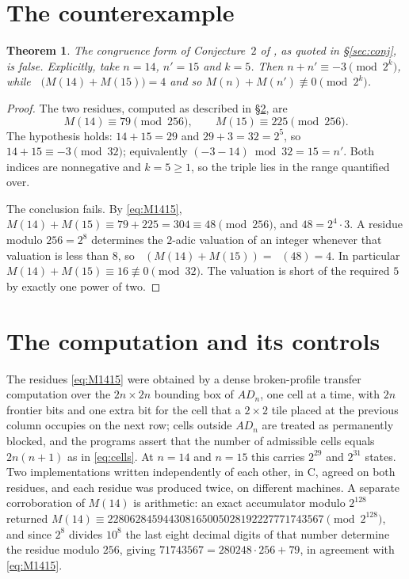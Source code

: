 \documentclass[11pt]{amsart}
\newtheorem{theorem}{Theorem}
\DeclareMathOperator{\vtwo}{v_2}
\begin{document}
\section{The counterexample}\label{sec:refute}

\begin{theorem}\label{thm:main}
The congruence form of Conjecture~$2$ of \cite{Propp}, as quoted in
\S\ref{sec:conj}, is false. Explicitly, take $n=14$, $n'=15$ and
$k=5$. Then $n+n'\equiv-3 \pmod{2^k}$, while
$\vtwo\bigl(M(14)+M(15)\bigr)=4$ and so $M(n)+M(n')\not\equiv0 \pmod{2^{k}}$.
\end{theorem}

\begin{proof}
The two residues, computed as described in \S\ref{sec:verify}, are
\begin{equation}\label{eq:M1415}
  M(14)\equiv 79 \pmod{256},
  \qquad
  M(15)\equiv 225 \pmod{256}.
\end{equation}
The hypothesis holds: $14+15=29$ and $29+3=32=2^5$, so $14+15\equiv-3
\pmod{32}$; equivalently $(-3-14) \bmod 32 = 15 = n'$. Both indices are
nonnegative and $k=5\ge1$, so the triple lies in the range quantified over.

The conclusion fails. By \eqref{eq:M1415}, $M(14)+M(15)\equiv 79+225=304\equiv
48\pmod{256}$, and $48=2^4\cdot3$. A residue modulo $256=2^8$ determines the
$2$-adic valuation of an integer whenever that valuation is less than $8$, so
$\vtwo(M(14)+M(15))=\vtwo(48)=4$. In particular
$M(14)+M(15)\equiv16\not\equiv0\pmod{32}$. The valuation is short of the
required $5$ by exactly one power of two.
\end{proof}

\section{The computation and its controls}\label{sec:verify}

The residues \eqref{eq:M1415} were obtained by a dense broken-profile transfer
computation over the $2n\times2n$ bounding box of $AD_n$, one cell at a time,
with $2n$ frontier bits and one extra bit for the cell that a $2\times2$ tile
placed at the previous column occupies on the next row; cells outside $AD_n$
are treated as permanently blocked, and the programs assert that the number of
admissible cells equals $2n(n+1)$ as in \eqref{eq:cells}. At $n=14$ and $n=15$
this carries $2^{29}$ and $2^{31}$ states. Two implementations written
independently of each other, in C, agreed on both residues, and each residue
was produced twice, on different machines. A separate corroboration of $M(14)$
is arithmetic: an exact accumulator modulo $2^{128}$ returned
$M(14)\equiv 228062845944308165005028192227771743567 \pmod{2^{128}}$, and
since $2^8$ divides $10^8$ the last eight decimal digits of that number
determine the residue modulo $256$, giving $71743567 = 280248\cdot256+79$, in
agreement with \eqref{eq:M1415}.
\end{document}

